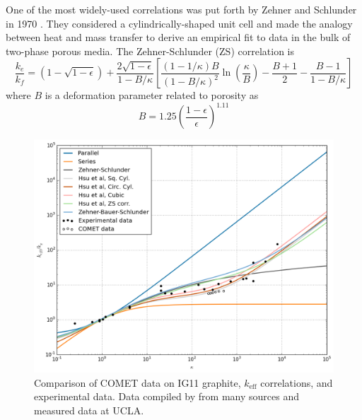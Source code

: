 \documentclass[11pt]{report} %
\begin{document}
One of the most widely-used correlations was put forth by Zehner and Schlunder in 1970 \cite{Zehner1970,Zehner1972}. They considered a cylindrically-shaped unit cell and made the analogy between heat and mass transfer to derive an empirical fit to data in the bulk of two-phase porous media. The Zehner-Schlunder (ZS) correlation is
\begin{equation}
    \frac{k_e}{k_f} = \left(1-\sqrt{1-\epsilon}\right)+\frac{2\sqrt{1-\epsilon}}{1-B/\kappa}\left[\frac{(1-1/\kappa)B}{(1-B/\kappa)^2}\ln\left( \frac{\kappa}{B} \right) - \frac{B+1}{2} - \frac{B-1}{1-B/\kappa}\right]
\end{equation}
where $B$ is a deformation parameter related to porosity as
\begin{equation}\label{eq:zs-B}
    B = 1.25\left(\frac{1-\epsilon}{\epsilon}\right)^{1.11}
\end{equation}

\begin{figure}[ht]
    \centering
    \includegraphics[width=\textwidth]{images/keff-kappa-experimental-comet}
    \caption{Comparison of COMET data on IG11 graphite, $k_\text{eff}$ correlations, and experimental data. Data compiled by \cite{VanAntwerpen2010} from many sources and measured data at UCLA.}
    \label{fig:kappa-experimental-comet}
\end{figure}
\end{document}
